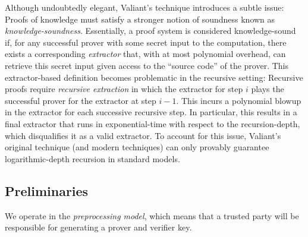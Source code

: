 Although undoubtedly elegant, 
Valiant's technique introduces a subtle issue:
Proofs of knowledge must satisfy a stronger notion of soundness 
known as \emph{knowledge-soundness}.
%
Essentially,
a proof system is considered knowledge-sound 
if, 
for any successful prover with some secret input to the computation, 
there exists a corresponding \emph{extractor} that,
with at most polynomial overhead,
can retrieve this secret input given access to the ``source code'' of the prover.
%
This extractor-based definition becomes problematic in the recursive setting:
Recursive proofs require \emph{recursive extraction} 
in which the extractor for step $i$ 
plays the successful prover for the extractor at step $i - 1$. 
This incurs a polynomial blowup in the extractor for each successive recursive step. 
In particular, 
this results in a final extractor that runs in exponential-time with respect to the recursion-depth, 
which disqualifies it as a valid extractor. 
%
To account for this issue, 
Valiant's original technique 
(and modern techniques) 
can only provably guarantee logarithmic-depth recursion in standard models.

\subsection{Preliminaries}

We operate in the \textit{preprocessing model}, which means that a trusted party will be responsible for generating a prover and verifier key.

